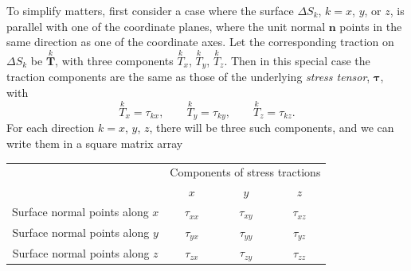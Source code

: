 \documentclass[a4paper,11pt]		{report}
\begin{document}
To simplify matters, first consider a case where the surface $\Delta
S_k$, $k=x$, $y$, or $z$, is parallel with one of the coordinate
planes, \ie where the unit normal $\bm{n}$ points in the same
direction as one of the coordinate axes.  Let the corresponding
traction on $\Delta S_k$ be $\stackrel{k}{\bm{T}}$, with three
components $\stackrel{k}{T}_x$, $\stackrel{k}{T}_y$,
$\stackrel{k}{T}_z$. Then in this special case the traction components
are the same as those of the underlying \emph{stress tensor},
$\bm{\tau}$, with
\begin{equation}
\stackrel{k}{T}_x=\tau_{kx}, \qquad
\stackrel{k}{T}_y=\tau_{ky}, \qquad
\stackrel{k}{T}_z=\tau_{kz}.
\end{equation}
For each direction $k=x$, $y$, $z$, there will be three such
components, and we can write them in a square matrix array
\begin{center}
\begin{tabular}{cccc}
& \multicolumn{3}{c}{Components of stress tractions}\\
& \hspace*{3ex}$x$\hspace*{2ex}&\hspace*{2ex}$y$\hspace*{2ex}&\hspace*{2ex}$z$\hspace*{3ex}\\
Surface normal points along $x$ &\hspace*{3ex}$\tau_{xx}$\hspace*{2ex}&\hspace*{2ex}$\tau_{xy}$\hspace*{2ex}&\hspace*{2ex}
$\tau_{xz}$\hspace*{3ex}\\
Surface normal points along $y$ &\hspace*{3ex}$\tau_{yx}$\hspace*{2ex}&\hspace*{2ex}$\tau_{yy}$\hspace*{2ex}&\hspace*{2ex}
$\tau_{yz}$\hspace*{3ex}\\
Surface normal points along $z$ &\hspace*{3ex}$\tau_{zx}$\hspace*{2ex}&\hspace*{2ex}$\tau_{zy}$\hspace*{2ex}&\hspace*{2ex}
$\tau_{zz}$\hspace*{3ex}\\
\end{tabular}
\end{center}
\end{document}
